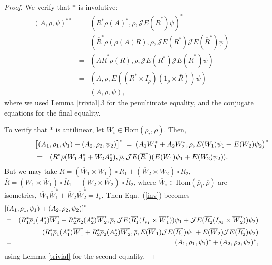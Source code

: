 \documentclass[12pt]{article}
\theoremstyle{definition}
\theoremstyle{definition}
\theoremstyle{remark}
\def\2#1{{\mathcal #1}}
\def\ol#1{{\overline #1}}
\newcommand{\Hom}{\mathrm{Hom}}
\begin{document}
\begin{proof}
We verify that $*$ is involutive:
\begin{eqnarray*}
  (A,\rho ,\psi )^{**} &=& (R^*\ol\rho (A)^*,\ol\rho ,\2JE(\ol R^*)\psi )^* \\
  &=& (\ol R^*\rho (\ol\rho (A)R),\rho,\2JE(R^*)\2JE(\ol R^*)\psi ) \\
  &=& (A\ol R^*\rho (R),\rho ,\2JE(R^*)\2JE(\ol R^*)\psi ) \\
  &=& (A,\rho ,E((R^*\times I_{\ol\rho})(1_{\ol\rho}\times \ol R))\psi ) \\
  &=& (A,\rho ,\psi ) ,
\end{eqnarray*}
where we used Lemma \ref{trivial}.3 for the penultimate equality, and the conjugate
equations for the final equality.

To verify that $*$ is antilinear, let $W_i\in \Hom (\rho _i,\rho )$.  Then,
\begin{eqnarray} \lefteqn{ \bigl[ (A_1,\rho _1,\psi _1)+(A_2,\rho _2,\psi _2)\bigr]
    ^* \:=\: \bigl(
    A_1W_1^*+A_2W_2^*,\rho ,E(W_1)\psi _1+E(W_2)\psi _2 \bigr) ^* } \nonumber \\
  &=& (R^*\ol\rho (W_1A_1^*+W_2A_2^*),\ol\rho ,\2JE(\ol R^*)(E(W_1)\psi _1+E(W_2)\psi
  _2)) .\label{inv} \end{eqnarray} But we may take $R=(\ol W_1\times W_1)\circ
R_1+(\ol W_2\times W_2)\circ R_2$, $\ol R=(W_1\times \ol W_1)\circ \ol R_1+(W_2\times
\ol W_2)\circ \ol R_2$, where $\ol W_i\in \Hom (\ol\rho _i,\ol\rho )$ are isometries,
$\ol W_1\ol W_1^*+\ol W_2\ol W_2^*=I_{\ol\rho}$.  Then Eqn.\ (\ref{inv}) becomes
\begin{eqnarray*} 
  \lefteqn{  \left[ (A_1,\rho _1,\psi _1)+(A_2,\rho _2,\psi _2)\right] ^* } \\
  &=& (R_1^*\ol\rho
  _1(A_1^*)\ol W_1^*+R_2^*\ol\rho _2(A_2^*)\ol W_2^*,\ol\rho ,\2JE(\ol R_1^*(I_{\rho _1}\times
  \ol W_1^*))\psi _1+\2JE(\ol R_2^*(I_{\rho _2}\times \ol W_2^*))\psi _2) \\
  &=& (R_1^*\ol \rho _1(A_1^*)\ol W_1^*+R_2^*\ol \rho _2(A_2^*)\ol W_2^*,\ol\rho ,E(\ol
  W_1)\2JE(\ol R_1^*)\psi _1+E(\ol W_2)\2JE(\ol R_2^*)\psi _2) \\
  &=& (A_1,\rho _1,\psi _1)^*+(A_2,\rho _2,\psi _2)^* ,\end{eqnarray*} using
Lemma \ref{trivial} for the second equality.


\end{proof}
\end{document}
